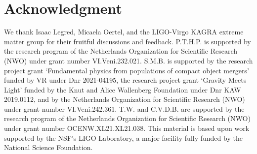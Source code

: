 \documentclass[prd,twocolumn,a4paper,floatfix,nofootinbib,preprintnumbers,superscriptaddress]{revtex4-1}
\begin{document}
\section*{Acknowledgment}
We thank Isaac Legred, Micaela Oertel, and the LIGO-Virgo KAGRA extreme matter group for their fruitful discussions and feedback. P.T.H.P. is supported by the research program of the Netherlands Organization for Scientific Research (NWO) under grant number VI.Veni.232.021. S.M.B. is supported by the research project grant `Fundamental physics from populations of compact object mergers' funded by VR under Dnr 2021-04195, the research project grant `Gravity Meets Light' funded by the Knut and Alice Wallenberg Foundation under Dnr KAW 2019.0112, and by the Netherlands Organization for Scientific Research (NWO) under grant number VI.Veni.242.361. T.W. and C.V.D.B. are supported by the research program of the Netherlands Organization for Scientific Research (NWO) under grant number OCENW.XL21.XL21.038. This material is based upon work supported by the NSF's LIGO Laboratory, a major facility fully funded by the National Science Foundation.



\end{document}
